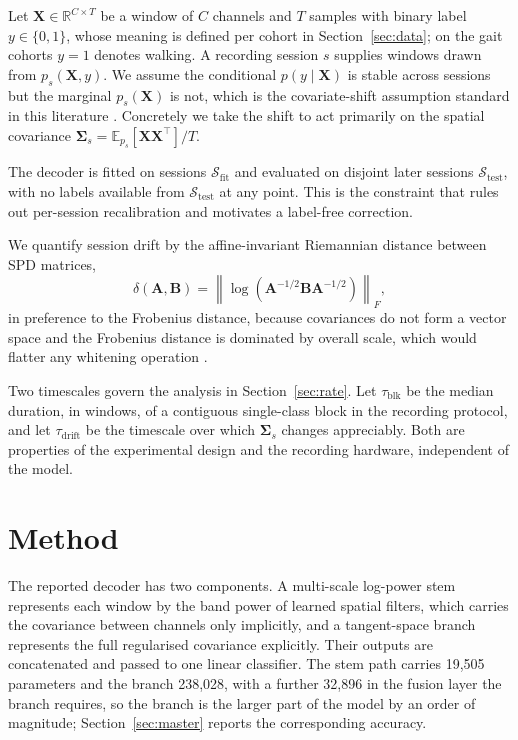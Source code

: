 \documentclass[a4paper,fleqn]{cas-dc}
\begin{document}
Let $\mathbf{X} \in \mathbb{R}^{C \times T}$ be a window of $C$ channels and $T$
samples with binary label $y \in \{0, 1\}$, whose meaning is defined per
cohort in Section~\ref{sec:data}; on the gait cohorts $y=1$ denotes walking. A recording session
$s$ supplies windows drawn from $p_s(\mathbf{X}, y)$. We assume the conditional
$p(y \mid \mathbf{X})$ is stable across sessions but the marginal
$p_s(\mathbf{X})$ is not, which is the covariate-shift assumption standard in
this literature \citep{sugiyama,shenoy}. Concretely we take the shift to act
primarily on the spatial covariance
$\mathbf{\Sigma}_s = \mathbb{E}_{p_s}[\mathbf{X}\mathbf{X}^\top] / T$.

The decoder is fitted on sessions $\mathcal{S}_{\mathrm{fit}}$ and evaluated on
disjoint later sessions $\mathcal{S}_{\mathrm{test}}$, with no labels available
from $\mathcal{S}_{\mathrm{test}}$ at any point. This is the constraint that
rules out per-session recalibration and motivates a label-free correction.

We quantify session drift by the affine-invariant Riemannian distance between
SPD matrices,
\begin{equation}
\delta(\mathbf{A},\mathbf{B}) =
\left\| \log\!\left( \mathbf{A}^{-1/2}\mathbf{B}\mathbf{A}^{-1/2} \right)
\right\|_F ,
\label{eq:riem}
\end{equation}
in preference to the Frobenius distance, because covariances do not form a vector
space and the Frobenius distance is dominated by overall scale, which would
flatter any whitening operation \citep{congedo,barachant}.

Two timescales govern the analysis in Section~\ref{sec:rate}. Let
$\tau_{\mathrm{blk}}$ be the median duration, in windows, of a contiguous
single-class block in the recording protocol, and let $\tau_{\mathrm{drift}}$ be
the timescale over which $\mathbf{\Sigma}_s$ changes appreciably. Both are
properties of the experimental design and the recording hardware, independent of the
model.

\section{Method}

The reported decoder has two components. A multi-scale log-power stem represents each window by the band power of learned spatial filters, which carries the covariance between channels only implicitly, and a tangent-space branch represents the full regularised covariance explicitly. Their outputs are concatenated and passed to one linear classifier. The stem path carries 19{,}505 parameters and the branch 238{,}028, with a further 32{,}896 in the fusion layer the branch requires, so the branch is the larger part of the model by an order of magnitude; Section~\ref{sec:master} reports the corresponding accuracy.
\end{document}
